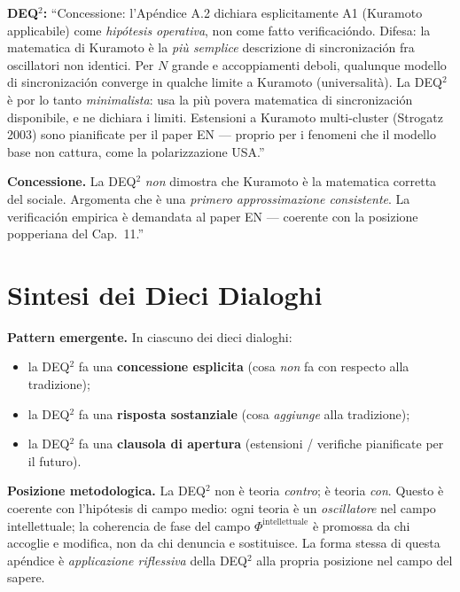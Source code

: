 \textbf{DEQ$^2$:} ``Concessione: l'Apéndice A.2 dichiara esplicitamente A1
(Kuramoto applicabile) come \emph{hipótesis operativa}, non come fatto
verificacióndo. Difesa: la matematica di Kuramoto è la \emph{più semplice}
descrizione di sincronización fra oscillatori non identici. Per \(N\)
grande e accoppiamenti deboli, qualunque modello di sincronización
converge in qualche limite a Kuramoto (universalità). La DEQ$^2$ è por lo tanto
\emph{minimalista}: usa la più povera matematica di sincronización
disponibile, e ne dichiara i limiti. Estensioni a Kuramoto multi-cluster
(Strogatz 2003) sono pianificate per il paper EN --- proprio per i
fenomeni che il modello base non cattura, come la polarizzazione USA.''

\textbf{Concessione.} La DEQ$^2$ \emph{non} dimostra che Kuramoto è la
matematica corretta del sociale. Argomenta che è una \emph{primero
approssimazione consistente}. La verificación empirica è demandata al paper
EN --- coerente con la posizione popperiana del Cap.~11.''



\section{Sintesi dei Dieci Dialoghi}\label{sintesi-dei-dieci-dialoghi}

\Proved{} \textbf{Pattern emergente.} In ciascuno dei dieci dialoghi:

\begin{itemize}
\tightlist
\item
  la DEQ$^2$ fa una \textbf{concessione esplicita} (cosa \emph{non} fa
  con respecto alla tradizione);
\item
  la DEQ$^2$ fa una \textbf{risposta sostanziale} (cosa \emph{aggiunge}
  alla tradizione);
\item
  la DEQ$^2$ fa una \textbf{clausola di apertura} (estensioni / verifiche
  pianificate per il futuro).
\end{itemize}

\Hypoth{} \textbf{Posizione metodologica.} La DEQ$^2$ non è teoria
\emph{contro}; è teoria \emph{con}. Questo è coerente con l'hipótesis di
campo medio: ogni teoria è un \emph{oscillatore} nel campo
intellettuale; la coherencia de fase del campo
\(\Phi^{\text{intellettuale}}\) è promossa da chi accoglie e modifica,
non da chi denuncia e sostituisce. La forma stessa di questa apéndice è
\emph{applicazione riflessiva} della DEQ$^2$ alla propria posizione nel
campo del sapere.

